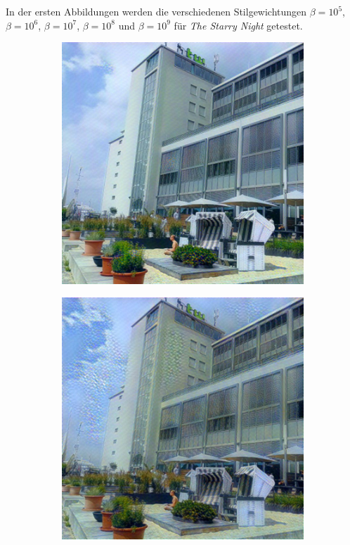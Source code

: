 In der ersten Abbildungen werden die verschiedenen
Stilgewichtungen $ \beta = 10^{5} $, $ \beta = 10^{6} $, $ \beta = 10^{7} $, $ \beta = 10^{8} $ und $ \beta = 10^{9} $ für \textit{The Starry Night} getestet.

\begin{figure}[H]
    \centering
    \begin{subfigure}[h]{0.15\textwidth}
        \centering
        \includegraphics[width=\textwidth]{resources/content/experiments/a__starry_night__768x768__style-weight_1e+05__tv-weight_0e+00.jpg}
    \end{subfigure}
    \begin{subfigure}[h]{0.15\textwidth}
        \centering
        \includegraphics[width=\textwidth]{resources/content/experiments/a__starry_night__768x768__style-weight_1e+06__tv-weight_0e+00.jpg}

\end{subfigure}
\end{figure}
